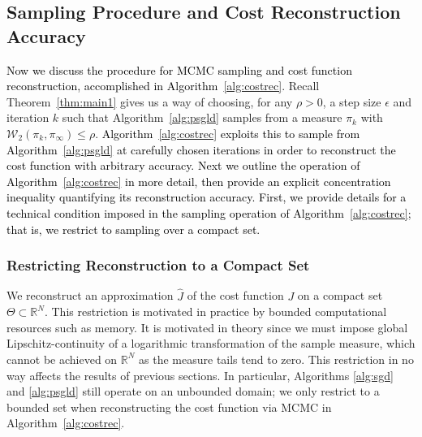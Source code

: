 \documentclass[journal,onecolumn]{IEEEtran}
\newtheorem{assumption}{A}
\newcommand{\step}{\epsilon}
\newcommand{\rew}{J}
\newcommand{\reals}{\mathbb{R}}
\newcommand{\dimn}{N}
\newcommand{\wass}{\mathcal{W}_2}
\newcommand{\gibbs}{\ids_{\infty}}
\newcommand{\dtlaw}{\ids_{k}} %
\newcommand{\ids}{\pi}
\newcommand{\idw}{\gamma}
\newcommand{\ksp}{k,\idw}
\newcommand{\wassprox}{\rho}
\begin{document}
\subsection{Sampling Procedure and Cost Reconstruction Accuracy} 
\textcolor{black}{Now we discuss the procedure for MCMC sampling and cost function reconstruction, accomplished in Algorithm~\ref{alg:costrec}}. Recall Theorem~\ref{thm:main1} gives us a way of choosing, for any $\wassprox > 0$, a step size $\step$ and iteration $k$ such that Algorithm~\ref{alg:psgld} samples from a measure $\pi_k$ with $\wass(\dtlaw,\gibbs) \leq \wassprox$. \textcolor{black}{Algorithm~\ref{alg:costrec} exploits this to sample from Algorithm~\ref{alg:psgld} at carefully chosen iterations in order to reconstruct the cost function with arbitrary accuracy. Next we outline the operation of Algorithm~\ref{alg:costrec} in more detail, then provide an explicit concentration inequality quantifying its reconstruction accuracy. First, we provide details for a technical condition imposed in the sampling operation of Algorithm~\ref{alg:costrec}; that is, we restrict to sampling over a compact set.}
\subsubsection{Restricting Reconstruction to a Compact Set} We reconstruct an approximation $\hat{\rew}$ of the cost function $\rew$ on a compact set $\Theta \subset \reals^{\dimn}$. This restriction is motivated in practice by bounded computational resources such as memory. It is motivated in theory since we must impose global Lipschitz-continuity of a logarithmic transformation of the sample measure, which cannot be achieved on $\reals^{\dimn}$ as the measure tails tend to zero. This restriction in no way affects the results of previous sections. In particular, Algorithms \ref{alg:sgd} and \ref{alg:psgld} still operate on an unbounded domain; we only restrict to a bounded set when reconstructing the cost function via MCMC in Algorithm~\ref{alg:costrec}.

\end{document}
